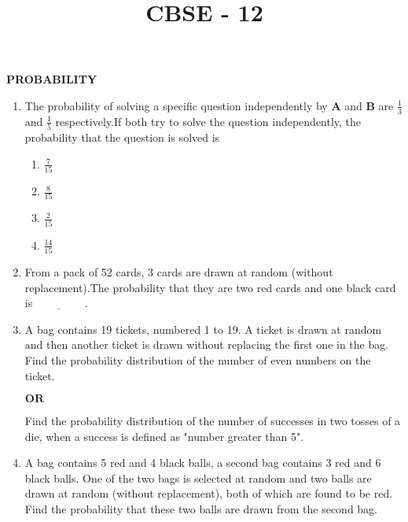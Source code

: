 \documentclass{article}
\let\vec\mathbf{}
\begin{document}
\begin{center}
\title{CBSE - 12\\ \vspace{\baselineskip}}
\date{}
\maketitle
\begin{center}
 \textbf{PROBABILITY}
\end{center}
\end{center}
\begin{enumerate}
    \item The probability of solving a specific question independently by $\vec{A}$ and $\vec{B}$ are $\frac{1}{3}$ and $\frac{1}{5}$ respectively.If both try to solve the question independently, the probability that the question is solved is
    \begin{enumerate}
        \item $\frac{7}{15}$
        \item $\frac{8}{15}$
        \item $\frac{2}{15}$
        \item $\frac{14}{15}$
    \end{enumerate}
    \item From a pack of 52 cards, 3 cards are drawn at random (without replacement).The probability that they are two red cards and one black card is$\underline{\hspace{2cm}}$.\\
    \item A bag contains 19 tickets, numbered 1 to 19. A ticket is drawn at random and then another ticket is drawn without replacing the first one in the bag. Find the probability distribution of the number of even numbers on the ticket.\\
    \begin{center}
        $\textbf{OR}$
    \end{center}
    Find the probability distribution of the number of successes in two tosses of a die, when a success is defined as "number greater than 5".\\
    \item A bag contains 5 red and 4 black balls, a second bag contains 3 red and 6 black balls. One of the two bags is selected at random and two balls are drawn at random (without replacement), both of which are found to be red. Find the probability that these two balls are drawn from the second bag.\\

\end{enumerate}
\end{document}
